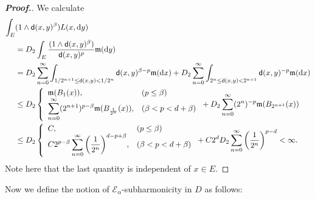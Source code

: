 \documentclass[12pt,a4paper]{article}
\renewcommand{\d}{\mathrm{d}}
\newcommand{\m}{\mathfrak{m} }
\newcommand{\1}{{\bf 1}}
\begin{document}
\begin{proof}[{\bf Proof.}]
We calculate 
\begin{align*}
\int_E&(1\land {\sf d}(x,y)^{\beta})L(x,{\d} y)\\
&=D_2
\int_E\frac{(1\land {\sf d}(x,y)^{\beta})}{{\sf d}(x,y)^p}{\m}({\d} y)\\
&=D_2\sum_{n=0}^{\infty}\int_{1/2^{n+1}\leq{\sf d}(x,y)<1/2^n}{\sf d}(x,y)^{\beta-p}{\m}({\d} x)+D_2\sum_{n=0}^{\infty}\int_{2^n\leq{\sf d}(x,y)<2^{n+1}}{\sf d}(x,y)^{-p}{\m}({\d} x)\\
&\leq D_2\left\{\begin{array}{ll}\displaystyle{{\m}(B_1(x))}, & 
\displaystyle{(p\leq\beta)} \\ \displaystyle{\sum_{n=0}^{\infty}(2^{n+1})^{p-\beta}{\m}(B_{\frac{1}{2^n}}(x))}, & 
\displaystyle{(\beta<p<d+\beta)}\end{array}\right. 
+ D_2\sum_{n=0}^{\infty}(2^n)^{-p}{\m}(B_{2^{n+1}}(x))\\
&\leq D_2
\left\{\begin{array}{ll}\displaystyle{C},  & \displaystyle{(p\leq\beta)}
 \\
 \displaystyle{C2^{p-\beta}\sum_{n=0}^{\infty}\left(\frac{1}{2^n}\right)^{d-p+\beta}},
  & \displaystyle{(\beta<p<d+\beta)}\end{array}\right. 
+ C2^dD_2\sum_{n=0}^{\infty}\left(\frac{1}{2^n}\right)^{p-d}<\infty.
\end{align*}
Note here that the last quantity is independent of $x\in E$. 
\end{proof}

Now we define the notion of $\mathscr{E}_{\alpha}$-subharmonicity in $D$ as follows: 
\end{document}
